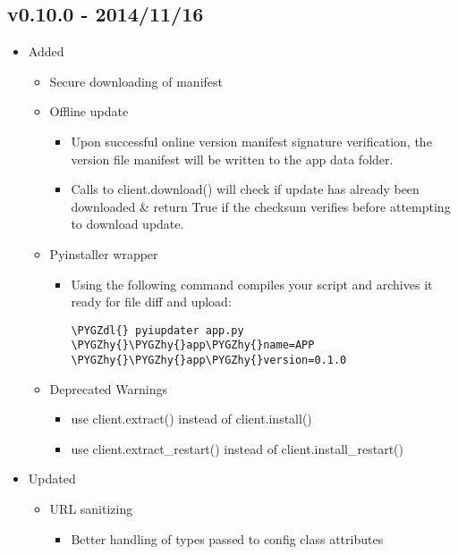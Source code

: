 \documentclass[letterpaper,10pt,english]{sphinxmanual}
\def\PYGZdl{\char`\$}
\def\PYGZhy{\char`\-}
\begin{document}
\subsection{v0.10.0 - 2014/11/16}
\label{release_history:v0-10-0-2014-11-16}\begin{itemize}
\item {} 
Added
\begin{itemize}
\item {} 
Secure downloading of manifest

\item {} 
Offline update
\begin{itemize}
\item {} 
Upon successful online version manifest signature verification, the version file manifest will be written to the app data folder.

\item {} 
Calls to client.download() will check if update has already been downloaded \& return True if the checksum verifies before attempting to download update.

\end{itemize}

\item {} 
Pyinstaller wrapper
\begin{itemize}
\item {} 
Using the following command compiles your script and archives it ready for file diff and upload:

\begin{Verbatim}[commandchars=\\\{\}]
\PYGZdl{} pyiupdater app.py \PYGZhy{}\PYGZhy{}app\PYGZhy{}name=APP \PYGZhy{}\PYGZhy{}app\PYGZhy{}version=0.1.0
\end{Verbatim}

\end{itemize}

\item {} 
Deprecated Warnings
\begin{itemize}
\item {} 
use client.extract() instead of client.install()

\item {} 
use client.extract\_restart() instead of client.install\_restart()

\end{itemize}

\end{itemize}

\item {} 
Updated
\begin{itemize}
\item {} 
URL sanitizing
\begin{itemize}
\item {} 
Better handling of types passed to config class attributes


\end{itemize}
\end{itemize}
\end{itemize}
\end{document}
